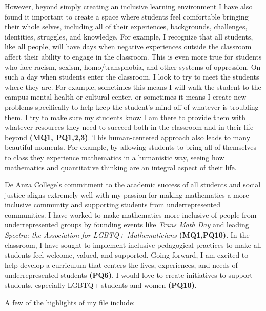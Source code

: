 \documentclass[11pt]{article}
\begin{document}
However, beyond simply creating an inclusive learning environment I have also found it important to create a space where students feel comfortable bringing their whole selves, including all of their experiences, backgrounds, challenges, identities, struggles, and knowledge. For example, I recognize that all students, like all people, will have days when negative experiences outside the classroom affect their ability to engage in the classroom. This is even more true for students who face racism, sexism, homo/transphobia, and other systems of oppression. On such a day when students enter the classroom, I look to try to meet the students where they are. For example, sometimes this means I will walk the student to the campus mental health or cultural center, or sometimes it means I create new problems specifically to help keep the student's mind off of whatever is troubling them. I try to make sure my students know I am there to provide them with whatever resources they need to succeed both in the classroom and in their life beyond \textbf{(MQ1, PQ1,2,3)}. This human-centered approach also leads to many beautiful moments. For example, by allowing students to bring all of themselves to class they experience mathematics in a humanistic way, seeing how mathematics and quantitative thinking are an integral aspect of their life. %


De Anza College's commitment to the academic success of all students and social justice aligns extremely well with my passion for making mathematics a more inclusive community and supporting students from underrepresented communities. I have worked to make mathematics more inclusive of people from underrepresented groups by founding events like \textit{Trans Math Day} and leading \textit{Spectra: the Association for LGBTQ+ Mathematicians} \textbf{(MQ1,PQ10)}.  In the classroom, I have sought to implement inclusive pedagogical practices to make all students feel welcome, valued, and supported. Going forward, I am excited to help develop a curriculum that centers the lives, experiences, and needs of underrepresented students \textbf{(PQ6)}. I would love to create initiatives to support students, especially LGBTQ+ students and women  \textbf{(PQ10)}. 

A few of the highlights of my file include:
\end{document}
